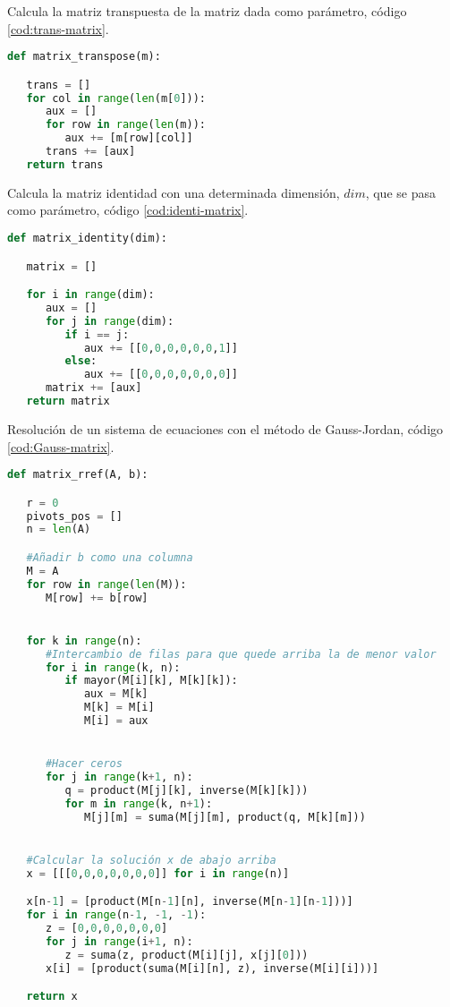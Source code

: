 Calcula la matriz transpuesta de la matriz dada como parámetro, código \ref{cod:trans-matrix}.\\

\begin{lstlisting}[language=Python,caption=Suma de dos elementos del cuerpo, label=cod:trans-matrix]
def matrix_transpose(m):

   trans = []
   for col in range(len(m[0])):
      aux = []
      for row in range(len(m)):
         aux += [m[row][col]]
      trans += [aux]
   return trans

\end{lstlisting}


Calcula la matriz identidad con una determinada dimensión, $dim$, que se pasa como parámetro, código \ref{cod:identi-matrix}.\\

\begin{lstlisting}[language=Python,caption=Matriz identidad del cuerpo, label=cod:identi-matrix]
def matrix_identity(dim):

   matrix = []

   for i in range(dim):
      aux = []
      for j in range(dim):
         if i == j:
            aux += [[0,0,0,0,0,0,1]]
         else:
            aux += [[0,0,0,0,0,0,0]]
      matrix += [aux]
   return matrix
\end{lstlisting}


Resolución de un sistema de ecuaciones con el método de Gauss-Jordan, código \ref{cod:Gauss-matrix}.\\

\begin{lstlisting}[language=Python,caption=Método de Gauss-Jordan, label=cod:Gauss-matrix]
def matrix_rref(A, b):

   r = 0
   pivots_pos = []
   n = len(A)

   #Añadir b como una columna
   M = A
   for row in range(len(M)):
      M[row] += b[row]


   for k in range(n):
      #Intercambio de filas para que quede arriba la de menor valor
      for i in range(k, n):
         if mayor(M[i][k], M[k][k]):
            aux = M[k]
            M[k] = M[i]
            M[i] = aux


      #Hacer ceros
      for j in range(k+1, n):
         q = product(M[j][k], inverse(M[k][k]))
         for m in range(k, n+1):
            M[j][m] = suma(M[j][m], product(q, M[k][m]))


   #Calcular la solución x de abajo arriba
   x = [[[0,0,0,0,0,0,0]] for i in range(n)]

   x[n-1] = [product(M[n-1][n], inverse(M[n-1][n-1]))]
   for i in range(n-1, -1, -1):
      z = [0,0,0,0,0,0,0]
      for j in range(i+1, n):
         z = suma(z, product(M[i][j], x[j][0]))
      x[i] = [product(suma(M[i][n], z), inverse(M[i][i]))]

   return x
\end{lstlisting}

